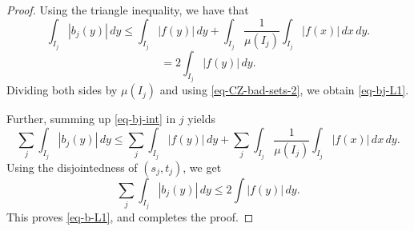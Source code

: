 \begin{proof}
Using the triangle inequality, we have that
\begin{equation*}
    \int_{I_j} |b_j(y)|\, dy\leq \int_{I_j} |f(y)|\, dy + \int_{I_j} \frac{1}{\mu(I_j)}\int_{I_j} |f(x)|\, dx\, dy.
\end{equation*}
\begin{equation}
    \label{eq-bj-int}
    =2 \int_{I_j} |f(y)|\, dy.
\end{equation}
Dividing both sides by $\mu(I_j)$ and using \eqref{eq-CZ-bad-sets-2}, we obtain \eqref{eq-bj-L1}.

Further, summing up \eqref{eq-bj-int} in $j$ yields
\begin{equation*}
    \sum_{j}\int_{I_j} |b_j(y)|\, dy\leq \sum_{j}\int_{I_j} |f(y)|\, dy + \sum_{j}\int_{I_j} \frac{1}{\mu(I_j)}\int_{I_j} |f(x)|\, dx\, dy.
\end{equation*}
Using the disjointedness of $(s_j, t_j)$, we get
\begin{equation*}
    \sum_{j}\int_{I_j} |b_j(y)|\, dy\leq 2 \int |f(y)|\, dy.
\end{equation*}
This proves \eqref{eq-b-L1}, and completes the proof.
\end{proof}

